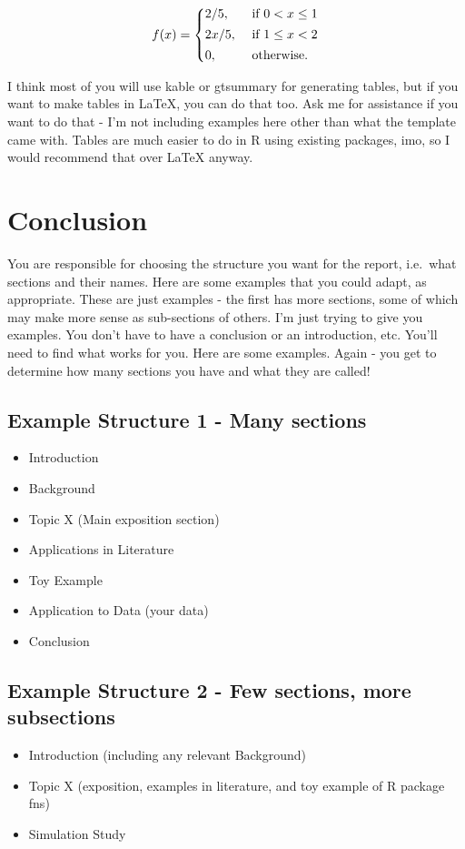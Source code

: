 \documentclass[
  12pt]{article}
\providecommand{\tightlist}{%
  \setlength{\itemsep}{0pt}\setlength{\parskip}{0pt}}
\begin{document}
\[
f(x) = \left\{ \begin{array}{@{}ll@{}}
2/5, & \mbox{ if } 0 < x \leq 1 \\[1ex]
2x/5, & \mbox{ if } 1 \leq x < 2 \\[1ex]
0, & \mbox{ otherwise.}  \end{array} \right.
\]

I think most of you will use kable or gtsummary for generating tables,
but if you want to make tables in LaTeX, you can do that too. Ask me for
assistance if you want to do that - I'm not including examples here
other than what the template came with. Tables are much easier to do in
R using existing packages, imo, so I would recommend that over LaTeX
anyway.

\section{Conclusion}\label{sec-conc}

You are responsible for choosing the structure you want for the report,
i.e.~what sections and their names. Here are some examples that you
could adapt, as appropriate. These are just examples - the first has
more sections, some of which may make more sense as sub-sections of
others. I'm just trying to give you examples. You don't have to have a
conclusion or an introduction, etc. You'll need to find what works for
you. Here are some examples. Again - you get to determine how many
sections you have and what they are called!

\subsection{Example Structure 1 - Many
sections}\label{example-structure-1---many-sections}

\begin{itemize}
\tightlist
\item
  Introduction
\item
  Background
\item
  Topic X (Main exposition section)
\item
  Applications in Literature
\item
  Toy Example
\item
  Application to Data (your data)
\item
  Conclusion
\end{itemize}

\subsection{Example Structure 2 - Few sections, more
subsections}\label{example-structure-2---few-sections-more-subsections}

\begin{itemize}
\tightlist
\item
  Introduction (including any relevant Background)
\item
  Topic X (exposition, examples in literature, and toy example of R
  package fns)
\item
  Simulation Study
\end{itemize}



\end{document}
